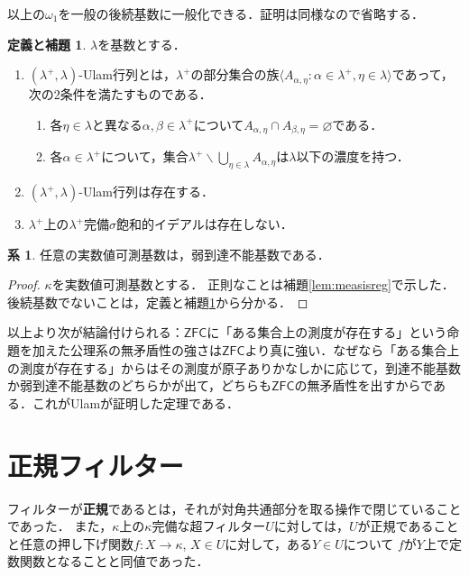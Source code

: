 \documentclass[uplatex]{jsarticle}
\newcommand{\ZFC}{\mathsf{ZFC}}
\newcommand{\seq}[1]{{\langle#1\rangle}}
\renewcommand\emptyset{\varnothing}
\renewcommand{\setminus}{\smallsetminus}
\theoremstyle{definition}
\newtheorem{cor}[thm]{系}
\newtheorem{defiandlem}[thm]{定義と補題}
\begin{document}
	以上の$\omega_1$を一般の後続基数に一般化できる．証明は同様なので省略する．
	
	\begin{defiandlem}\label{dl:lambdaplusulam}
		$\lambda$を基数とする．
		\begin{enumerate}
			\item $(\lambda^+, \lambda)$-Ulam行列とは，$\lambda^+$の部分集合の族$\seq{ A_{\alpha, \eta} : \alpha \in \lambda^+, \eta \in \lambda }$であって，次の2条件を満たすものである．
			\begin{enumerate}
				\item 各$\eta \in \lambda$と異なる$\alpha, \beta \in \lambda^+$について$A_{\alpha,\eta} \cap A_{\beta,\eta} = \emptyset$である．
				\item 各$\alpha \in \lambda^+$について，集合$\lambda^+ \setminus \bigcup_{\eta \in \lambda} A_{\alpha,\eta}$は$\lambda$以下の濃度を持つ．
			\end{enumerate}
			\item $(\lambda^+, \lambda)$-Ulam行列は存在する．
			\item $\lambda^+$上の$\lambda^+$完備$\sigma$飽和的イデアルは存在しない．
		\end{enumerate}
	\end{defiandlem}
	
	\begin{cor}
		任意の実数値可測基数は，弱到達不能基数である．
	\end{cor}
	\begin{proof}
		$\kappa$を実数値可測基数とする．
		正則なことは補題\ref{lem:measisreg}で示した．
		後続基数でないことは，定義と補題\ref{dl:lambdaplusulam}から分かる．
	\end{proof}
	
	以上より次が結論付けられる：$\ZFC$に「ある集合上の測度が存在する」という命題を加えた公理系の無矛盾性の強さは$\ZFC$より真に強い．なぜなら「ある集合上の測度が存在する」からはその測度が原子ありかなしかに応じて，到達不能基数か弱到達不能基数のどちらかが出て，どちらも$\ZFC$の無矛盾性を出すからである．これがUlamが証明した定理である．
		
	\section{正規フィルター}
	
	フィルターが\textbf{正規}であるとは，それが対角共通部分を取る操作で閉じていることであった．
	また，$\kappa$上の$\kappa$完備な超フィルター$U$に対しては，$U$が正規であることと任意の押し下げ関数$f \colon X \to \kappa$, $X \in U$に対して，ある$Y \in U$について $f$が$Y$上で定数関数となることと同値であった．
	
\end{document}
